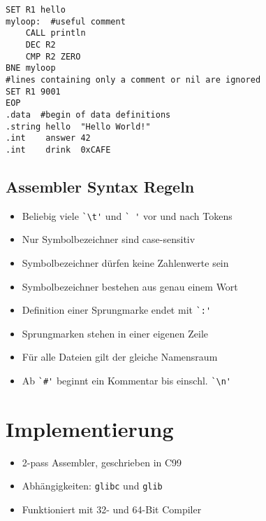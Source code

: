 \begin{frame}[fragile]{\insertsubsection}
\begin{verbatim}
SET R1 hello
myloop:  #useful comment
    CALL println
    DEC R2
    CMP R2 ZERO
BNE myloop
#lines containing only a comment or nil are ignored
SET R1 9001
EOP
.data  #begin of data definitions
.string hello  "Hello World!"
.int    answer 42
.int    drink  0xCAFE
\end{verbatim}
\end{frame}

\subsection{Assembler Syntax Regeln}

\begin{frame}[fragile]{\insertsubsection}
    \begin{itemize}
        \item Beliebig viele \verb#`\t'# und \verb*#` '# vor und nach Tokens
        \item Nur Symbolbezeichner sind case-sensitiv
        \item Symbolbezeichner dürfen keine Zahlenwerte sein
        \item Symbolbezeichner bestehen aus genau einem Wort
    \end{itemize}
\end{frame}

\begin{frame}[fragile]{\insertsubsection}
    \begin{itemize}
        \item Definition einer Sprungmarke endet mit \verb#`:'#
        \item Sprungmarken stehen in einer eigenen Zeile
        \item Für alle Dateien gilt der gleiche Namensraum
        \item Ab \verb|`#'| beginnt ein Kommentar bis einschl. \verb#`\n'#
    \end{itemize}
\end{frame}

\section{Implementierung}

\begin{frame}[fragile]{\insertsection}
    \begin{itemize}
        \item 2-pass Assembler, geschrieben in C99
        \item Abhängigkeiten: \texttt{glibc} und \texttt{glib}
        \item Funktioniert mit 32- und 64-Bit Compiler
    \end{itemize}
\end{frame}

